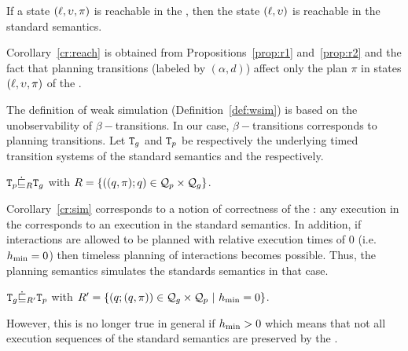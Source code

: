 \begin{corollary}\label{cr:reach}
If a state $(\ell,\upsilon,\pi)$ is reachable in the \lpsb, then the state $(\ell,\upsilon)$ is 
  reachable in the standard semantics.
\end{corollary}

Corollary~\ref{cr:reach} is obtained from Propositions~\ref{prop:r1} and~\ref{prop:r2} and the 
fact that planning transitions (labeled by $(\alpha,d)$) affect only the plan $\pi$ in 
states $(\ell,\upsilon,\pi)$ of the \lpsabr.

The definition of weak simulation (Definition~\ref{def:wsim})
is based on the unobservability of $\beta-$transitions. 
In our case, $\beta-$transitions corresponds to planning transitions.
Let $\texttt{T}_g$ and $\texttt{T}_p$ be respectively the underlying timed transition systems of the standard
semantics and the \lps respectively.
\begin{corollary}\label{cr:sim}
  $\texttt{T}_p\dot{\sqsubseteq}_{R} \texttt{T}_g$ with $R=\{((q,\pi);q)\in\mathcal{Q}_p\times\mathcal{Q}_g\}$.
\end{corollary}

Corollary~\ref{cr:sim} corresponds to a notion of correctness of the \lpsb: any execution in 
the \lpsabrb corresponds to an execution in the standard semantics.
In addition, if interactions are allowed to be planned with relative execution times of $0$ 
(i.e. $h_{\min} = 0$) then timeless planning of interactions becomes possible. Thus, the planning 
semantics simulates the standards semantics in that case.
\begin{corollary}
  $\texttt{T}_g\dot{\sqsubseteq}_{R'} \texttt{T}_p$ with $R'=\{(\q;(\q,\pi))\in\Q_g\times\Q_p\ | \ \hmin=0\}$.
\end{corollary}

However, this is no longer true in general if  $h_{\min} > 0$ which means that not all execution 
sequences of the standard semantics are preserved by the \lpsb.

